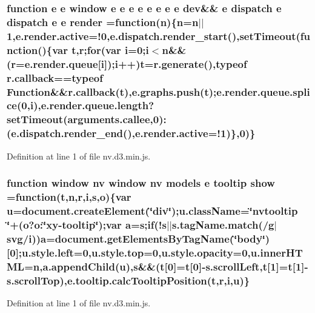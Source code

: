 \subsubsection[{render}]{\setlength{\rightskip}{0pt plus 5cm}function {\bf e} {\bf e} {\bf window} {\bf e} {\bf e} {\bf e} {\bf e} {\bf e} {\bf e} {\bf e} {\bf e} {\bf dev}\&\& {\bf e} {\bf dispatch} {\bf e} {\bf dispatch} {\bf e} {\bf e} render =function({\bf n})\{{\bf n}={\bf n}$\vert$$\vert$1,{\bf e.\+render.\+active}=!0,e.\+dispatch.\+render\+\_\+start(),set\+Timeout(function()\{var t,{\bf r};{\bf for}(var {\bf i}=0;{\bf i}$<${\bf n}\&\&({\bf r}={\bf e.\+render.\+queue}[{\bf i}]);{\bf i}++)t=r.\+generate(),typeof {\bf r.\+callback}==typeof Function\&\&{\bf r.\+callback}(t),e.\+graphs.\+push(t);e.\+render.\+queue.\+splice(0,{\bf i}),e.\+render.\+queue.\+length?set\+Timeout(arguments.\+callee,0)\+:(e.\+dispatch.\+render\+\_\+end(),{\bf e.\+render.\+active}=!1)\},0)\}}\label{nv_8d3_8min_8js_a3e46b8a379b72a3cb0db2fb7d6dabc0d}


Definition at line 1 of file nv.\+d3.\+min.\+js.

\subsubsection[{show}]{\setlength{\rightskip}{0pt plus 5cm}function {\bf window} {\bf nv} {\bf window} {\bf nv} {\bf models} {\bf e} {\bf tooltip} show =function(t,{\bf n},{\bf r},{\bf i},s,{\bf o})\{var u=document.\+create\+Element(\char`\"{}div\char`\"{});u.\+class\+Name=\char`\"{}nvtooltip \char`\"{}+(o?o\+:\char`\"{}xy-\/{\bf tooltip}\char`\"{});var {\bf a}=s;{\bf if}(!s$\vert$$\vert$s.\+tag\+Name.\+match(/g$\vert${\bf svg}/{\bf i})){\bf a}=document.\+get\+Elements\+By\+Tag\+Name(\char`\"{}body\char`\"{})[0];u.\+style.\+left=0,u.\+style.\+top=0,u.\+style.\+opacity=0,u.\+inner\+H\+T\+M\+L={\bf n},a.\+append\+Child(u),s\&\&(t[0]=t[0]-\/s.\+scroll\+Left,t[1]=t[1]-\/s.\+scroll\+Top),{\bf e.\+tooltip.\+calc\+Tooltip\+Position}(t,{\bf r},{\bf i},u)\}}\label{nv_8d3_8min_8js_a30309c74fad7d49a1f359a969fca7fff}


Definition at line 1 of file nv.\+d3.\+min.\+js.

